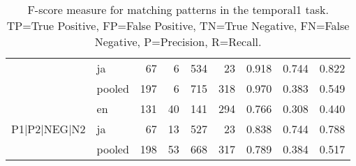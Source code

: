 \begin{table}[h!]
\begin{tabular}{llrrrrrrr}
 & ja & 67 & 6 & 534 & 23 & 0.918 & 0.744 & 0.822 \\
 & pooled & 197 & 6 & 715 & 318 & 0.970 & 0.383 & 0.549 \\
\cline{1-9}
\multirow[t]{3}{*}{P1|P2|NEG|N2} & en & 131 & 40 & 141 & 294 & 0.766 & 0.308 & 0.440 \\
 & ja & 67 & 13 & 527 & 23 & 0.838 & 0.744 & 0.788 \\
 & pooled & 198 & 53 & 668 & 317 & 0.789 & 0.384 & 0.517 \\
\cline{1-9}
\bottomrule
\end{tabular}
\caption{F-score measure for matching patterns in the temporal1 task. TP=True Positive, FP=False Positive, TN=True Negative, FN=False Negative, P=Precision, R=Recall.}
\label{tab:temporal1_f1}
\end{table}

